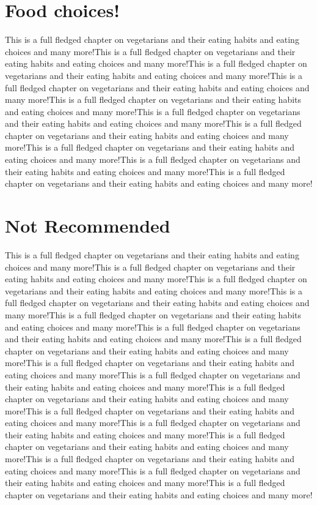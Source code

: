 \documentclass[10pt,a4paper]{report}
\begin{document}
\section{Food choices!}
This is a full fledged chapter on vegetarians and their eating habits and eating choices and many more!This is a full fledged chapter on vegetarians and their eating habits and eating choices and many more!This is a full fledged chapter on vegetarians and their eating habits and eating choices and many more!This is a full fledged chapter on vegetarians and their eating habits and eating choices and many more!This is a full fledged chapter on vegetarians and their eating habits and eating choices and many more!This is a full fledged chapter on vegetarians and their eating habits and eating choices and many more!This is a full fledged chapter on vegetarians and their eating habits and eating choices and many more!This is a full fledged chapter on vegetarians and their eating habits and eating choices and many more!This is a full fledged chapter on vegetarians and their eating habits and eating choices and many more!This is a full fledged chapter on vegetarians and their eating habits and eating choices and many more!
\section{Not Recommended}
This is a full fledged chapter on vegetarians and their eating habits and eating choices and many more!This is a full fledged chapter on vegetarians and their eating habits and eating choices and many more!This is a full fledged chapter on vegetarians and their eating habits and eating choices and many more!This is a full fledged chapter on vegetarians and their eating habits and eating choices and many more!This is a full fledged chapter on vegetarians and their eating habits and eating choices and many more!This is a full fledged chapter on vegetarians and their eating habits and eating choices and many more!This is a full fledged chapter on vegetarians and their eating habits and eating choices and many more!This is a full fledged chapter on vegetarians and their eating habits and eating choices and many more!This is a full fledged chapter on vegetarians and their eating habits and eating choices and many more!This is a full fledged chapter on vegetarians and their eating habits and eating choices and many more!This is a full fledged chapter on vegetarians and their eating habits and eating choices and many more!This is a full fledged chapter on vegetarians and their eating habits and eating choices and many more!This is a full fledged chapter on vegetarians and their eating habits and eating choices and many more!This is a full fledged chapter on vegetarians and their eating habits and eating choices and many more!This is a full fledged chapter on vegetarians and their eating habits and eating choices and many more!This is a full fledged chapter on vegetarians and their eating habits and eating choices and many more!
\end{document}
